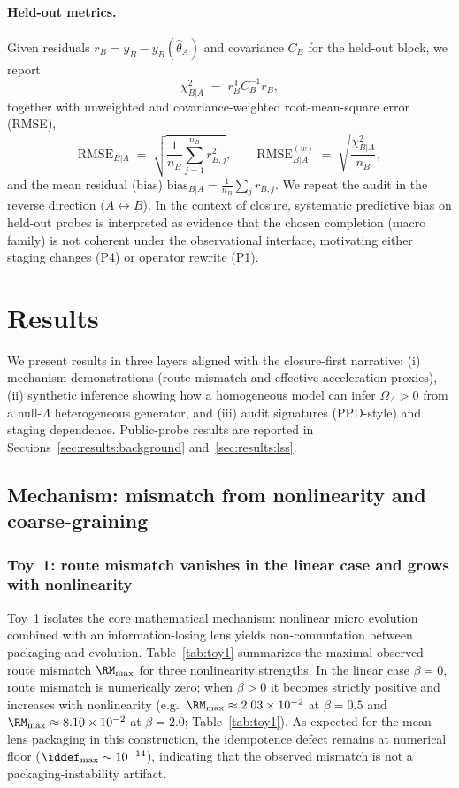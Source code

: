 \documentclass[11pt]{article}
\theoremstyle{definition}
\theoremstyle{plain}
\theoremstyle{remark}
\begin{document}
\paragraph{Held-out metrics.}
Given residuals $r_B = y_B - y_B(\hat\theta_A)$ and covariance $C_B$ for the held-out block, we report
\begin{equation}
\chi^2_{B|A} \;=\; r_B^{\mathsf T}C_B^{-1}r_B,
\label{eq:chi2_test}
\end{equation}
together with unweighted and covariance-weighted root-mean-square error (RMSE),
\begin{equation}
\mathrm{RMSE}_{B|A} \;=\; \sqrt{\frac{1}{n_B}\sum_{j=1}^{n_B} r_{B,j}^2},
\qquad
\mathrm{RMSE}^{(w)}_{B|A} \;=\; \sqrt{\frac{\chi^2_{B|A}}{n_B}},
\label{eq:rmse_defs}
\end{equation}
and the mean residual (bias) $\mathrm{bias}_{B|A}=\frac{1}{n_B}\sum_j r_{B,j}$.
We repeat the audit in the reverse direction ($A\leftrightarrow B$).
In the context of closure, systematic predictive bias on held-out probes is interpreted as evidence that the chosen completion (macro family) is not coherent under the observational interface, motivating either staging changes (P4) or operator rewrite (P1).

\section{Results}\label{sec:results}
We present results in three layers aligned with the closure-first narrative: (i) mechanism demonstrations (route mismatch and effective acceleration proxies), (ii) synthetic inference showing how a homogeneous model can infer $\Omega_\Lambda>0$ from a null-$\Lambda$ heterogeneous generator, and (iii) audit signatures (PPD-style) and staging dependence. Public-probe results are reported in Sections~\ref{sec:results:background} and~\ref{sec:results:lss}.

\subsection{Mechanism: mismatch from nonlinearity and coarse-graining}\label{sec:results:mechanism}

\subsubsection{Toy~1: route mismatch vanishes in the linear case and grows with nonlinearity}\label{sec:results:toy1}
Toy~1 isolates the core mathematical mechanism: nonlinear micro evolution combined with an information-losing lens yields non-commutation between packaging and evolution.
Table~\ref{tab:toy1} summarizes the maximal observed route mismatch $\RM_{\max}$ for three nonlinearity strengths.
In the linear case $\beta=0$, route mismatch is numerically zero; when $\beta>0$ it becomes strictly positive and increases with nonlinearity (e.g.\ $\RM_{\max}\approx 2.03\times 10^{-2}$ at $\beta=0.5$ and $\RM_{\max}\approx 8.10\times 10^{-2}$ at $\beta=2.0$; Table~\ref{tab:toy1}).
As expected for the mean-lens packaging in this construction, the idempotence defect remains at numerical floor ($\iddef_{\max}\sim 10^{-14}$), indicating that the observed mismatch is not a packaging-instability artifact.
\end{document}

